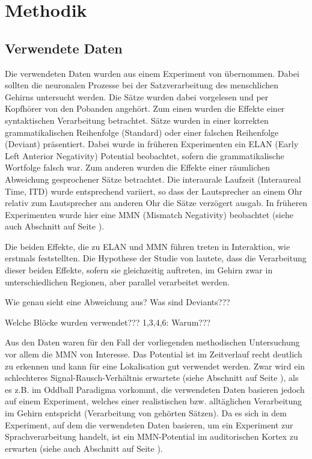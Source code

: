 \documentclass[doc,a4paper,12pt]{apa6}
\makeatletter
\DeclareRobustCommand*{\nameref}[1]{%
      \glqq{\myorg@nameref{#1}}\grqq%
    }%
\makeatother
\begin{document}
\newpage

\section{Methodik}
\label{sec:methodik}

\subsection{Verwendete Daten}

Die verwendeten Daten wurden aus einem Experiment von \textcite{herrmann2011syntactic} übernommen. Dabei sollten die neuronalen Prozesse bei der Satzverarbeitung des menschlichen Gehirns untersucht werden. Die Sätze wurden dabei vorgelesen und per Kopfhörer von den Pobanden angehört. Zum einen wurden die Effekte einer syntaktischen Verarbeitung betrachtet. Sätze wurden in einer korrekten grammatikalischen Reihenfolge (Standard) oder einer falschen Reihenfolge (Deviant) präsentiert. Dabei wurde in früheren Experimenten ein ELAN (Early Left Anterior Negativity) Potential beobachtet, sofern die grammatikalische Wortfolge falsch war. Zum anderen wurden die Effekte einer räumlichen Abweichung gesprochener Sätze betrachtet. Die interaurale Laufzeit (Interaureal Time, ITD) wurde entsprechend variiert, so dass der Lautsprecher an einem Ohr relativ zum Lautsprecher am anderen Ohr die Sätze verzögert ausgab. In früheren Experimenten wurde hier eine MMN (Mismatch Negativity) beobachtet (siehe auch Abschnitt \nameref{sec:erf} auf Seite \pageref{sec:erf}).

Die beiden Effekte, die zu ELAN und MMN führen treten in Interaktion, wie \textcite{hahne2002differential} erstmals feststellten. Die Hypothese der Studie von \textcite{herrmann2011syntactic} lautete, dass die Verarbeitung dieser beiden Effekte, sofern sie gleichzeitig auftreten, im Gehirn zwar in unterschiedlichen Regionen, aber parallel verarbeitet werden.

Wie genau sieht eine Abweichung aus? Was sind Deviants???

Welche Blöcke wurden verwendet??? 1,3,4,6: Warum???

Aus den Daten waren für den Fall der vorliegenden methodischen Untersuchung vor allem die MMN von Interesse. Das Potential ist im Zeitverlauf recht deutlich zu erkennen und kann für eine Lokalisation gut verwendet werden. Zwar wird ein schlechteres Signal-Rausch-Verhältnis erwartete (siehe Abschnitt \nameref{sec:snr} auf Seite \pageref{sec:snr}), als es z.B. im Oddball Paradigma \parencite{naatanen2004mismatch} vorkommt, die verwendeten Daten basieren jedoch auf einem Experiment, welches einer realistischen bzw. alltäglichen Verarbeitung im Gehirn entspricht (Verarbeitung von gehörten Sätzen). Da es sich in dem Experiment, auf dem die verwendeten Daten basieren, um ein Experiment zur Sprachverarbeitung handelt, ist ein MMN-Potential im auditorischen Kortex zu erwarten (siehe auch Abschnitt \nameref{sec:audicort} auf Seite \pageref{sec:audicort}).
\end{document}

